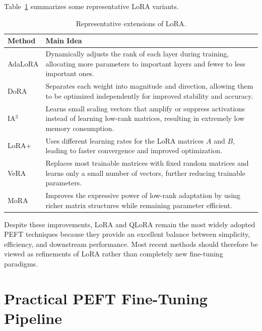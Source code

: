 Table~\ref{tab:modern_peft} summarizes some representative LoRA variants.
\begin{table}[H]
\centering
\caption{Representative extensions of LoRA.}
\label{tab:modern_peft}

\renewcommand{\arraystretch}{1.35}

\begin{tabular}{|p{2.6cm}|p{9cm}|}
\hline
\rowcolor{gray!15}
\textbf{Method} &
\textbf{Main Idea} \\
\hline

AdaLoRA &
Dynamically adjusts the rank of each layer during training, allocating more parameters to important layers and fewer to less important ones. \\
\hline

DoRA &
Separates each weight into magnitude and direction, allowing them to be optimized independently for improved stability and accuracy. \\
\hline

IA$^3$ &
Learns small scaling vectors that amplify or suppress activations instead of learning low-rank matrices, resulting in extremely low memory consumption. \\
\hline

LoRA+ &
Uses different learning rates for the LoRA matrices $A$ and $B$, leading to faster convergence and improved optimization. \\
\hline

VeRA &
Replaces most trainable matrices with fixed random matrices and learns only a small number of vectors, further reducing trainable parameters. \\
\hline

MoRA &
Improves the expressive power of low-rank adaptation by using richer matrix structures while remaining parameter efficient. \\
\hline

\end{tabular}

\end{table}
Despite these improvements, LoRA and QLoRA remain the most widely adopted PEFT techniques because they provide an excellent balance between simplicity, efficiency, and downstream performance. Most recent methods should therefore be viewed as refinements of LoRA rather than completely new fine-tuning paradigms.
\section{Practical PEFT Fine-Tuning Pipeline}

